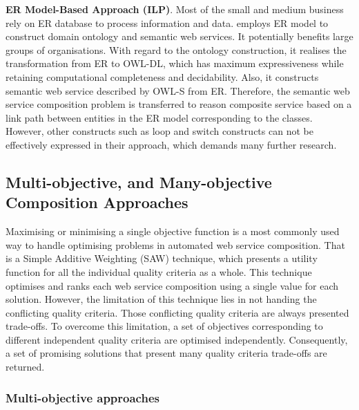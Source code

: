 \textbf{ER Model-Based Approach (ILP)}. Most of the small and medium business rely on ER database to process information and data. \cite{xu2010semantic} employs ER model to construct domain ontology and semantic web services.  It potentially benefits large groups of organisations. With regard to the ontology construction, it realises the transformation from ER to OWL-DL, which has maximum expressiveness while retaining computational completeness and decidability. Also,  it constructs semantic web service described by OWL-S  from ER.  Therefore, the semantic web service composition problem is transferred to reason composite service based on a link path between entities in the ER model corresponding to the classes.  However, other constructs such as loop and switch constructs can not be effectively expressed in their approach, which demands many further research.

\subsection{Multi-objective, and Many-objective Composition Approaches}\label{multiobjective}
Maximising or minimising a single objective function is a most commonly used way to handle optimising problems in automated web service composition.  That is a Simple Additive Weighting (SAW) \cite{hwang1981lecture} technique, which presents a utility function for all the individual quality criteria as a whole. This technique optimises and ranks each web service composition using a single value for each solution. However,  the limitation of this technique lies in not handing the conflicting quality criteria.  Those conflicting quality criteria are always presented trade-offs. To overcome this limitation, a set of objectives corresponding to different independent quality criteria are optimised independently. Consequently,  a set of promising solutions that present many quality criteria trade-offs are returned.


\subsubsection{Multi-objective approaches}\label{MultiObjective}

